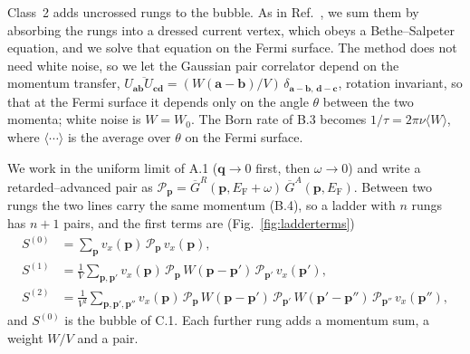 Class~2 adds uncrossed rungs to the bubble. As in
Ref.~\cite{Coleman2015}, we sum them by absorbing the rungs into a
dressed current vertex, which obeys a Bethe--Salpeter equation, and we
solve that equation on the Fermi surface. The method does not need white noise, so we let the Gaussian pair
correlator depend on the momentum transfer,
$\overline{U_{\mathbf a\mathbf b}U_{\mathbf c\mathbf d}}
=(W(\mathbf a-\mathbf b)/V)\,\delta_{\mathbf a-\mathbf b,\,\mathbf d-\mathbf c}$,
rotation invariant, so that at the Fermi surface it depends only on the
angle $\theta$ between the two momenta; white noise is $W=W_0$. The
Born rate of B.3 becomes $1/\tau=2\pi\nu\langle W\rangle$, where
$\langle\cdots\rangle$ is the average over $\theta$ on the Fermi
surface.

We work in the uniform limit of A.1 ($\mathbf q\to0$ first, then
$\omega\to0$) and write a retarded--advanced pair as
$\mathcal P_{\mathbf p}=\overline G^R(\mathbf p,E_{\mathrm F}+\omega)\,
\overline G^A(\mathbf p,E_{\mathrm F})$. Between two rungs the two lines carry
the same momentum (B.4), so a ladder with $n$ rungs has $n+1$ pairs,
and the first terms are (Fig.~\ref{fig:ladderterms})
\[
\begin{aligned}
S^{(0)}&=\sum_{\mathbf p}v_x(\mathbf p)\,\mathcal P_{\mathbf p}\,v_x(\mathbf p),\\
S^{(1)}&=\frac1V\sum_{\mathbf p,\mathbf p'}
v_x(\mathbf p)\,\mathcal P_{\mathbf p}\,W(\mathbf p-\mathbf p')\,
\mathcal P_{\mathbf p'}\,v_x(\mathbf p'),\\
S^{(2)}&=\frac1{V^2}\sum_{\mathbf p,\mathbf p',\mathbf p''}
v_x(\mathbf p)\,\mathcal P_{\mathbf p}\,W(\mathbf p-\mathbf p')\,
\mathcal P_{\mathbf p'}\,W(\mathbf p'-\mathbf p'')\,
\mathcal P_{\mathbf p''}\,v_x(\mathbf p''),
\end{aligned}
\]
and $S^{(0)}$ is the bubble of C.1. Each further rung adds a momentum
sum, a weight $W/V$ and a pair.

